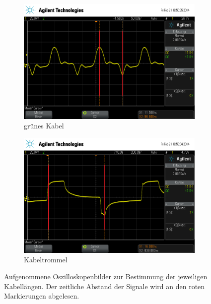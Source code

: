 \begin{figure}
  \begin{subfigure}{0.4\textwidth}
    \includegraphics[width=\textwidth]{laenge_gruen.png}
    \caption{grünes Kabel}
    \label{fig:laenge_gruen}
  \end{subfigure}
  \quad
  \begin{subfigure}{0.4\textwidth}
    \includegraphics[width=\textwidth]{laenge_trommel.png}
    \caption{Kabeltrommel}
    \label{fig:laenge_trommel}
  \end{subfigure}

  \caption{Aufgenommene Oszilloskopenbilder zur Bestimmung der
    jeweiligen Kabellängen. Der zeitliche Abstand der Signale wird an
    den roten Markierungen abgelesen.}
\end{figure}

